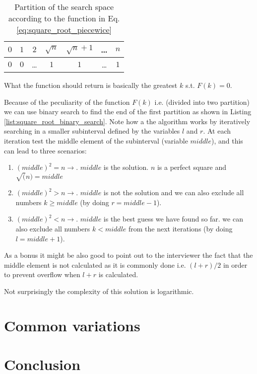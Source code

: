 \begin{table}[]
	\centering
	\begin{tabular}{|c|c|c|c|c|c|c|}
		\hline
		$0$ & $1$ & $2$   & $\sqrt{n}$ & $\sqrt{n}+1$ & \ldots   & $n$ \\ \hline
		$0$ & $0$ & \ldots & $1$ & $1$ & \ldots & $1$   \\ \hline
	\end{tabular}
\label{tab:sqrt_split_space}
\caption{Partition of the search space according to the function in Eq. \ref{eq:square_root_piecewice}}
\end{table}
What the function should return is basically the greatest $k$ s.t. $F(k)=0$. 

Because of the peculiarity of the function $F(k)$ i.e. (divided into two partition) we can use binary search to find the end of the first partition as shown in Listing \ref{list:square_root_binary_search}. Note how a the algorithm works by iteratively searching in a smaller subinterval defined by the variables $l$ and $r$. At each iteration test the middle element of the subinterval (variable $middle$), and this can lead to three scenarios:

\begin{enumerate}
 	\item $(middle)^2  = n \longrightarrow$. $middle$ is the solution. $n$ is a perfect square and $\sqrt(n)=middle$
 	\item $(middle)^2  > n \longrightarrow$. $middle$ is not the solution and we can also exclude all numbers $k \geq middle$ (by doing $r = middle-1$).
 	\item $(middle)^2  < n \longrightarrow$. $middle$ is the best guess we have found so far. we can also exclude all numbers $k < middle$ from the next iterations (by doing $l = middle+1$).
\end{enumerate}
As a bonus it might be also good to point out to the interviewer the fact that the middle element is not calculated as it is commonly done i.e. $(l+r)/2$ in order to prevent overflow when $l+r$ is calculated.

\begin{minipage}{\linewidth}
	
\end{minipage}

Not surprisingly the complexity of this solution is logarithmic.

\section{Common variations}

\section{Conclusion}
